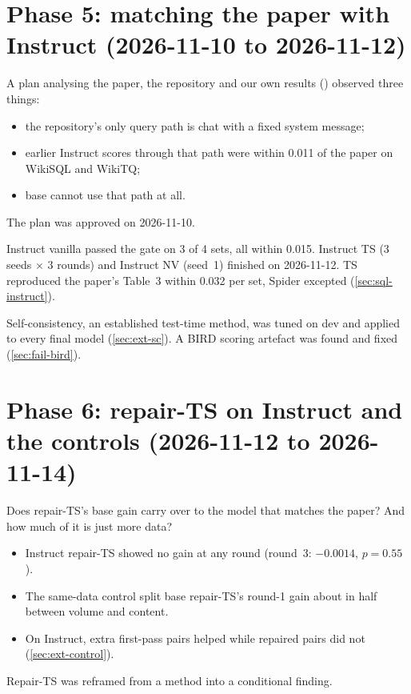 \section{Phase 5: matching the paper with Instruct (2026-11-10 to 2026-11-12)}

\begin{description}[style=nextline,leftmargin=1.2em]
\item[Motivation.] A plan analysing the paper, the repository and our own results () observed
three things:
  \begin{itemize}
  \item the repository's only query path is chat with a fixed system message;
  \item earlier Instruct scores through that path were within 0.011 of the paper on WikiSQL and WikiTQ;
  \item base cannot use that path at all.
  \end{itemize}
The plan was approved on 2026-11-10.
\item[Result.] Instruct vanilla passed the gate on 3 of 4 sets, all within 0.015. Instruct TS (3 seeds $\times$ 3
rounds) and Instruct NV (seed~1) finished on 2026-11-12. TS reproduced the paper's Table~3 within 0.032 per set,
Spider excepted (\cref{sec:sql-instruct}).
\item[Alongside.] Self-consistency, an established test-time method, was tuned on dev and applied to every final model
(\cref{sec:ext-sc}). A BIRD scoring artefact was found and fixed (\cref{sec:fail-bird}).
\end{description}

\section{Phase 6: repair-TS on Instruct and the controls (2026-11-12 to 2026-11-14)}

\begin{description}[style=nextline,leftmargin=1.2em]
\item[Motivation.] Does repair-TS's base gain carry over to the model that matches the paper? And how much of it is
just more data?
\item[Result.]
  \begin{itemize}
  \item Instruct repair-TS showed no gain at any round (round~3: $-0.0014$, $p=0.55$).
  \item The same-data control split base repair-TS's round-1 gain about in half between volume and content.
  \item On Instruct, extra first-pass pairs helped while repaired pairs did not (\cref{sec:ext-control}).
  \end{itemize}
\item[Consequence.] Repair-TS was reframed from a method into a conditional finding.
\end{description}

